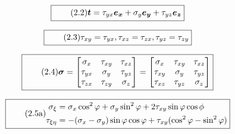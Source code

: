 \documentclass[11pt]{article}
\newcommand{\1}{ {\mathds{1}} }
\begin{document}
    \begin{equation}
      \boxed{
        \tag{2.2}
        \begin{split}
          \boldsymbol{t}
          =
          \tau_{yx} \boldsymbol{e_x}
          +
          \sigma_y  \boldsymbol{e_y}
          +
          \tau_{yz} \boldsymbol{e_z}
        \end{split}
      }
    \end{equation}

    \begin{equation}
      \boxed{
        \tag{2.3}
        \begin{split}
          \tau_{xy} = \tau_{yx},
          \tau_{xz} = \tau_{zx},
          \tau_{yz} = \tau_{zy}
        \end{split}
      }
    \end{equation}
    
    \begin{equation}
      \boxed{
        \tag{2.4}
        \begin{split}
          \boldsymbol{\sigma}
          =
          \begin{bmatrix*}
            \sigma_{x} & \tau_{xy}  & \tau_{xz} \\
            \tau_{yx}  & \sigma_{y} & \tau_{yz} \\
            \tau_{zx}  & \tau_{zy}  & \sigma_{z}
          \end{bmatrix*}
          =
          \begin{bmatrix*}
            \sigma_{x} & \tau_{xy}  & \tau_{xz} \\
            \tau_{xy}  & \sigma_{y} & \tau_{yz} \\
            \tau_{xz}  & \tau_{yz}  & \sigma_{z}
          \end{bmatrix*}          
        \end{split}
      }
    \end{equation}

    \begin{equation}
      \boxed{
        \tag{2.5a}
        \begin{split}
          \sigma_{\xi} &= \sigma_x \cos^2 \varphi + \sigma_y \sin^2\varphi + 2 \tau_{xy} \sin\varphi \cos\phi\\
          \tau_{\xi \eta} &= -(\sigma_x - \sigma_y) \sin \varphi \cos \varphi + \tau_{xy} (\cos^2\varphi - \sin^2\varphi)
        \end{split}
      }
    \end{equation}
   
\end{document}

